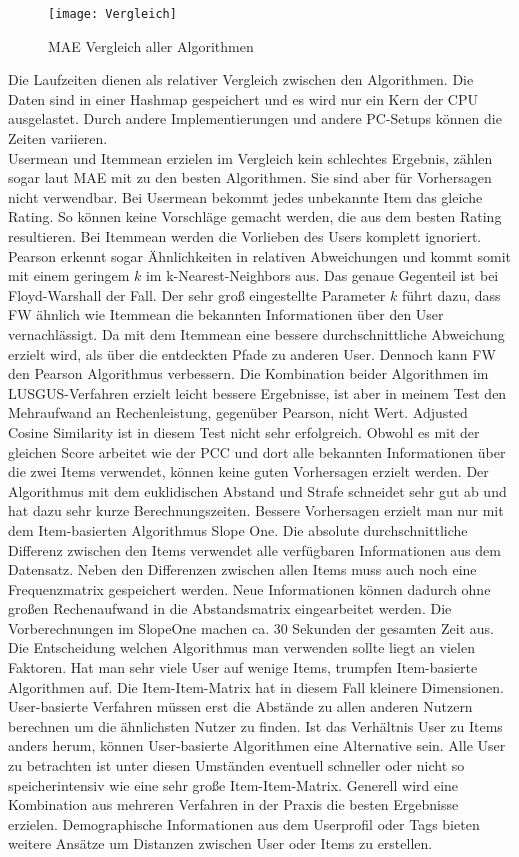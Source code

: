 \begin{figure}[htbp!]
\centering
\texttt{[image: Vergleich]}
\caption{MAE Vergleich aller Algorithmen}
\label{fig:Vergleich}
\end{figure}
\FloatBarrier
Die Laufzeiten dienen als relativer Vergleich zwischen den Algorithmen. Die Daten sind in einer Hashmap gespeichert und es wird nur ein Kern der CPU ausgelastet. Durch andere Implementierungen und andere PC-Setups können die Zeiten variieren.\\
Usermean und Itemmean erzielen im Vergleich kein schlechtes Ergebnis, zählen sogar laut MAE mit zu den besten Algorithmen. Sie sind aber für Vorhersagen nicht verwendbar. Bei Usermean bekommt jedes unbekannte Item das gleiche Rating. So können keine Vorschläge gemacht werden, die aus dem besten Rating resultieren. Bei Itemmean werden die Vorlieben des Users komplett ignoriert. Pearson erkennt sogar Ähnlichkeiten in relativen Abweichungen und kommt somit mit einem geringem $k$ im k-Nearest-Neighbors aus. Das genaue Gegenteil ist bei Floyd-Warshall der Fall. Der sehr groß eingestellte Parameter $k$ führt dazu, dass FW ähnlich wie Itemmean die bekannten Informationen über den User vernachlässigt. Da mit dem Itemmean eine bessere durchschnittliche Abweichung erzielt wird, als über die entdeckten Pfade zu anderen User. Dennoch kann FW den Pearson Algorithmus verbessern. Die Kombination beider Algorithmen im LUSGUS-Verfahren erzielt leicht bessere Ergebnisse, ist aber in meinem Test den Mehraufwand an Rechenleistung, gegenüber Pearson, nicht Wert. Adjusted Cosine Similarity ist in diesem Test nicht sehr erfolgreich. Obwohl es mit der gleichen Score arbeitet wie der PCC und dort alle bekannten Informationen über die zwei Items verwendet, können keine guten Vorhersagen erzielt werden. Der Algorithmus mit dem euklidischen Abstand und Strafe schneidet sehr gut ab und hat dazu sehr kurze Berechnungszeiten. Bessere Vorhersagen erzielt man nur mit dem Item-basierten Algorithmus Slope One. Die absolute durchschnittliche Differenz zwischen den Items verwendet alle verfügbaren Informationen aus dem Datensatz. Neben den Differenzen zwischen allen Items muss auch noch eine Frequenzmatrix gespeichert werden. Neue Informationen können dadurch ohne großen Rechenaufwand in die Abstandsmatrix eingearbeitet werden. Die Vorberechnungen im SlopeOne machen ca. 30 Sekunden der gesamten Zeit aus.\\
Die Entscheidung welchen Algorithmus man verwenden sollte liegt an vielen Faktoren. Hat man sehr viele User auf wenige Items, trumpfen Item-basierte Algorithmen auf. Die Item-Item-Matrix hat in diesem Fall kleinere Dimensionen. User-basierte Verfahren müssen erst die Abstände zu allen anderen Nutzern berechnen um die ähnlichsten Nutzer zu finden. Ist das Verhältnis User zu Items anders herum, können User-basierte Algorithmen eine Alternative sein. Alle User zu betrachten ist unter diesen Umständen eventuell schneller oder nicht so speicherintensiv wie eine sehr große Item-Item-Matrix. Generell wird eine Kombination aus mehreren Verfahren in der Praxis die besten Ergebnisse erzielen. Demographische Informationen aus dem Userprofil oder Tags bieten weitere Ansätze um Distanzen zwischen User oder Items zu erstellen. \\
